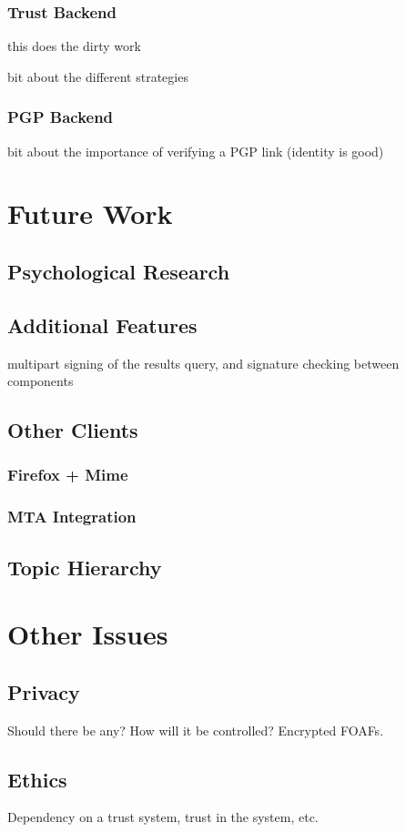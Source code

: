 \documentclass{acm_proc_article-sp}
\begin{document}
\subsubsection{Trust Backend}
this does the dirty work

bit about the different strategies

\subsubsection{PGP Backend}
bit about the importance of verifying a PGP link (identity is good)

\section{Future Work}
\subsection{Psychological Research}
\subsection{Additional Features}
multipart signing of the results query, and signature checking between components
\subsection{Other Clients}
\subsubsection{Firefox + Mime}
\subsubsection{MTA Integration}
\subsection{Topic Hierarchy}
\section{Other Issues}
\subsection{Privacy}
Should there be any?  How will it be controlled?
Encrypted FOAFs.

\subsection{Ethics}
Dependency on a trust system, trust in the system, etc.
\end{document}
